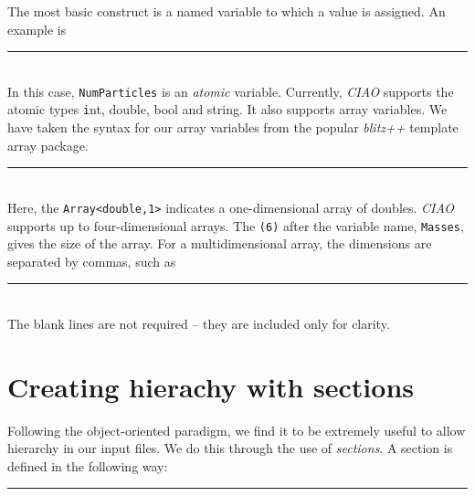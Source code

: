 \documentclass{book}
\begin{document}
The most basic construct is a named variable to which a value is
assigned.  An example is \\
\rule{0.6cm}{0cm} \\
In this case, \texttt{NumParticles} is an {\em atomic} variable.
Currently, {\em CIAO} supports the atomic types {\texttt int, double,
  bool and string}.  It also supports array variables.  We have taken
the syntax for our array variables from the popular {\em blitz++}
template array package. \\
\rule{0.6cm}{0cm} \\
Here, the \texttt{Array<double,1>} indicates a one-dimensional array
of doubles.  {\em CIAO} supports up to four-dimensional arrays.  The
\texttt{(6)} after the variable name, \texttt{Masses}, gives the size
of the array.  For a multidimensional array, the dimensions are
separated by commas, such as\\
\rule{0.6cm}{0cm}\\
The blank lines are not required -- they are included only for
clarity.  

\section{Creating hierachy with sections}
Following the object-oriented paradigm, we find it to be extremely
useful to allow hierarchy in our input files.  We do this through the
use of {\em sections}.  A section is defined in the following way:\\
\rule{0.6cm}{0cm}
\end{document}
